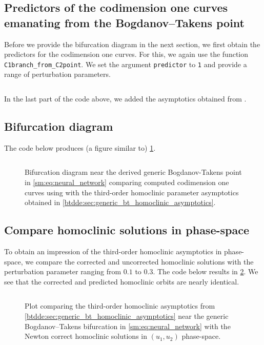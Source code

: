\subsection{Predictors of the codimension one curves emanating from the Bogdanov--Takens point}
Before we provide the bifurcation diagram in the next section, we first obtain the predictors
for the codimension one curves. For this, we again use the function
\texttt{C1branch_from_C2point}. We set the argument \texttt{predictor} to \texttt{1}
and provide a range of perturbation parameters.
\inputminted[firstline=121, lastline=133]{MATLAB}{\pathToDDEBifToolDemos/neural_network_model/neural_network_model.m}
In the last part of the code above, we added the asymptotics obtained from \cite{Jiao2021}.

\subsection{Bifurcation diagram}
The code below produces (a figure similar to) \cref{sm:fig:NeuralNetworkCompareParameters}.
\inputminted[firstline=135, lastline=156]{MATLAB}{\pathToDDEBifToolDemos/neural_network_model/neural_network_model.m}
%
\begin{figure}[ht]
    \centering
    \caption{Bifurcation diagram near the derived generic Bogdanov-Takens point in
        \cref{sm:eq:neural_network} comparing computed codimension one curves using
        \DDEBIFTOOL with the third-order homoclinic parameter asymptotics obtained
        in \cref{btdde:sec:generic_bt_homoclinic_asymptotics}.}
    \label{sm:fig:NeuralNetworkCompareParameters}
\end{figure}

\subsection{Compare homoclinic solutions in phase-space}
To obtain an impression of the third-order homoclinic asymptotics in
phase-space, we compare the corrected and uncorrected homoclinic solutions
with the perturbation parameter ranging from $0.1$ to $0.3$.
The code below results in \cref{sm:fig:NeuralNetworkCompareOrbitsPhaseSpace}.
We see that the corrected and predicted homoclinic orbits are nearly identical.
\inputminted[firstline=158, lastline=174]{MATLAB}{\pathToDDEBifToolDemos/neural_network_model/neural_network_model.m}
%
\begin{figure}[ht]
    \centering
    \caption{Plot comparing the third-order homoclinic asymptotics from
        \cref{btdde:sec:generic_bt_homoclinic_asymptotics} near the generic
        Bogdanov--Takens bifurcation in \cref{sm:eq:neural_network} with the
        Newton correct homoclinic solutions in $(u_1,u_2)$ phase-space.}
    \label{sm:fig:NeuralNetworkCompareOrbitsPhaseSpace}
\end{figure}

